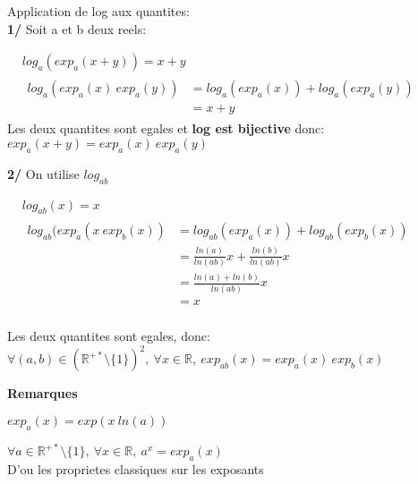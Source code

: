 \documentclass[12pt,twoside,a4paper]{article}
\begin{document}
	\begin{preuve}
		Application de log aux quantites:\\
		\textbf{1/} Soit a et b deux reels:
		\begin{tab}$\begin{aligned}
			&log_a(exp_a(x+y))=x+y\\
			&\begin{aligned}log_a(exp_a(x)\ exp_a(y))&=log_a(exp_a(x))+log_a(exp_a(y))\\
				&=x+y\end{aligned}\end{aligned}$\\
			Les deux quantites sont egales et \textbf{log est bijective} donc:\\
			$exp_a(x+y)=exp_a(x)\ exp_a(y)$
		\end{tab}
		\textbf{2/} On utilise $log_{ab}$\\
		\begin{tab}$\begin{aligned}
				&log_{ab}(x)=x\\
				&\begin{aligned}log_{ab}(exp_a(x\ exp_b(x))&=log_{ab}(exp_a(x))+log_{ab}(exp_b(x))\\
					&=\frac{ln(a)}{ln(ab)}x+\frac{ln(b)}{ln(ab)}x\\
					&=\frac{ln(a)+ln(b)}{ln(ab)}x\\
					&=x
		\end{aligned}\end{aligned}$\\\\
		Les deux quantites sont egales, donc:\\
		$\forall(a,b)\in\left(\mathbb{R}^{+*}\setminus\{1\}\right)^2,\ \forall x\in\mathbb{R},\ exp_{ab}(x)=exp_a(x)\ exp_b(x)$\end{tab}		
	\end{preuve}
	\textbf{Remarques}\\
	\begin{liste}\item $exp_a(x)=exp(x\ ln(a))$
		\item $\forall a\in\mathbb{R}^{+*}\setminus\{1\},\ \forall x\in\mathbb{R},\ a^x=exp_a(x)$\\
			D'ou les proprietes classiques sur les exposants
	\end{liste}
\end{document}
